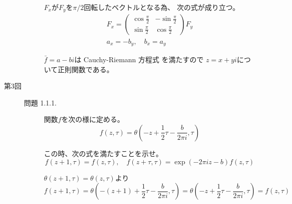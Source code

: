 \documentclass[12pt,b5paper]{ltjsarticle}
\begin{document}
\begin{description}
\begin{description}
            $F_{x}$が$F_{y}$を$\pi/2$回転したベクトルとなる為、
            次の式が成り立つ。
            \begin{gather}
             F_{x}=
              \begin{pmatrix}
              \cos{\frac{\pi}{2}} & -\sin{\frac{\pi}{2}} \\
              \sin{\frac{\pi}{2}} & \cos{\frac{\pi}{2}}
              \end{pmatrix}
              F_{y}
             \\
             a_{x}=-b_{y}
             ,\quad
             b_{x}=a_{y}
            \end{gather}


            $\bar{f}=a-bi$は
            Cauchy-Riemann 方程式
            を満たすので
            $z=x+yi$について正則関数である。

\hrulefill

\end{description}


 \item[第3回]
 \begin{description}
  \item[問題 1.1.1.]

             関数$f$を次の様に定める。
             \begin{equation}
              f(z,\tau)
               = \theta(-z +\frac{1}{2}\tau - \frac{b}{2\pi i},\tau)
             \end{equation}
             
             この時、次の式を満たすことを示せ。
             \begin{equation}
              f(z+1,\tau) = f(z,\tau)
               ,\quad
               f(z+\tau,\tau)
               = \exp{(-2\pi iz-b)} f(z,\tau)
             \end{equation}

\dotfill

             $\theta(z+1,\tau) = \theta(z,\tau)$より
             \begin{equation}
              f(z+1,\tau)
               =\theta(-(z+1) +\frac{1}{2}\tau - \frac{b}{2\pi i},\tau)
               =\theta(-z +\frac{1}{2}\tau - \frac{b}{2\pi i},\tau)
               = f(z,\tau)
             \end{equation}


\end{description}
\end{description}
\end{document}
